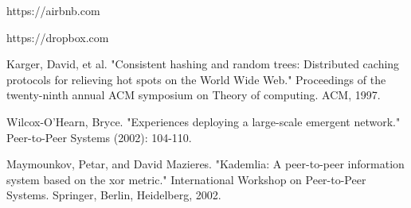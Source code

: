 \documentclass[conference]{IEEEtran}
\begin{document}
\begin{thebibliography}{1}
 https://airbnb.com

 https://dropbox.com

 Karger, David, et al. "Consistent hashing and random trees: Distributed caching protocols for relieving hot spots on the World Wide Web." Proceedings of the twenty-ninth annual ACM symposium on Theory of computing. ACM, 1997.

 Wilcox-O’Hearn, Bryce. "Experiences deploying a large-scale emergent network." Peer-to-Peer Systems (2002): 104-110.

 Maymounkov, Petar, and David Mazieres. "Kademlia: A peer-to-peer information system based on the xor metric." International Workshop on Peer-to-Peer Systems. Springer, Berlin, Heidelberg, 2002.

\end{thebibliography}

% 







\end{document}
